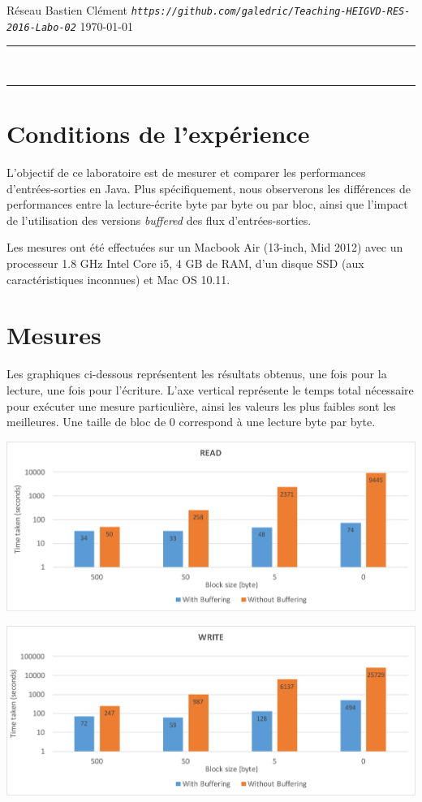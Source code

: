 \documentclass[a4paper,11pt]{article}
\begin{document}
	
{\sc Réseau} \hfill Bastien Clément\newline 
{\tt \em https://github.com/galedric/Teaching-HEIGVD-RES-2016-Labo-02} \hfill \today \newline
\hrule
\vspace{5mm}
\\[1.5mm]
\hrule
\vspace{3mm}

\section{Conditions de l'expérience}

L'objectif de ce laboratoire est de mesurer et comparer les performances d'entrées-sorties en Java. Plus spécifiquement, nous observerons les différences de performances entre la lecture-écrite byte par byte ou par bloc, ainsi que l'impact de l'utilisation des versions \emph{buffered} des flux d'entrées-sorties.

Les mesures ont été effectuées sur un Macbook Air (13-inch, Mid 2012) avec un processeur 1.8 GHz Intel Core i5, 4 GB de RAM, d'un disque SSD (aux caractéristiques inconnues) et Mac OS 10.11.

\section{Mesures}

Les graphiques ci-dessous représentent les résultats obtenus, une fois pour la lecture, une fois pour l'écriture. L'axe vertical représente le temps total nécessaire pour exécuter une mesure particulière, ainsi les valeurs les plus faibles sont les meilleures. Une taille de bloc de 0 correspond à une lecture byte par byte.\\

\begin{center}
	\includegraphics[width=15cm]{read}
	
	\includegraphics[width=15cm]{write}
\end{center}
\end{document}

